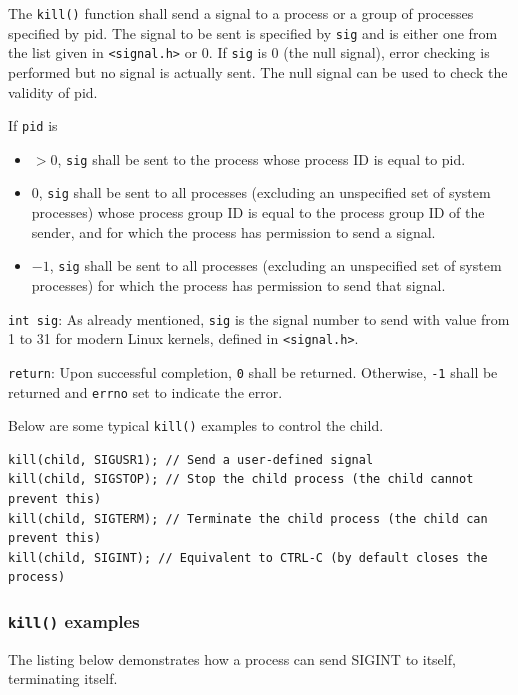 \documentclass[a4paper]{article}
\begin{document}
The \texttt{kill()} function shall send a signal to a process or a group of processes specified by pid. The signal to be sent is specified by \texttt{sig} and is either one from the list given in \texttt{<signal.h>} or 0. If \texttt{sig} is 0 (the null signal), error checking is performed but no signal is actually sent. The null signal can be used to check the validity of pid.

If \texttt{pid} is
\begin{itemize}
    \item $>0$, \texttt{sig} shall be sent to the process whose process ID is equal to pid.
    \item $0$, \texttt{sig} shall be sent to all processes (excluding an unspecified set of system processes) whose process group ID is equal to the process group ID of the sender, and for which the process has permission to send a signal.
    \item $-1$, \texttt{sig} shall be sent to all processes (excluding an unspecified set of system processes) for which the process has permission to send that signal.
\end{itemize}
\texttt{int sig}:
As already mentioned, \texttt{sig} is the signal number to send with value from 1 to 31 for modern Linux kernels, defined in \texttt{<signal.h>}. 

\texttt{return}: Upon successful completion, \texttt{0} shall be returned. Otherwise, \texttt{-1} shall be returned and \texttt{errno} set to indicate the error.

Below are some typical \texttt{kill()} examples to control the child.
\begin{verbatim}
kill(child, SIGUSR1); // Send a user-defined signal
kill(child, SIGSTOP); // Stop the child process (the child cannot prevent this)
kill(child, SIGTERM); // Terminate the child process (the child can prevent this)
kill(child, SIGINT); // Equivalent to CTRL-C (by default closes the process)
\end{verbatim}



\subsubsection{\texttt{kill()} examples}
\begin{exmp}
The listing below demonstrates how a process can send SIGINT to itself, terminating itself.
\end{exmp}

\end{document}
